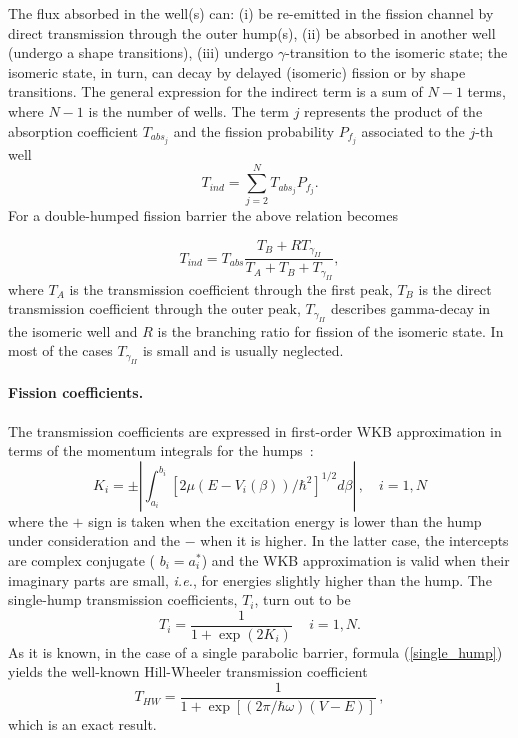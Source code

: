 \documentclass[twocolumn,amsmath,amssymb,10pt,groupedaddress,a4paper]{revtex4}
\begin{document}
The flux absorbed in the well(s) can:
\newline\qquad(i) be re-emitted in the fission channel by direct transmission
                  through the outer hump(s),
\newline\qquad(ii) be absorbed in another well (undergo a shape transitions),
\newline\qquad(iii) undergo $\gamma$-transition to the isomeric state; the
                   isomeric state, in turn, can decay by delayed (isomeric)
                   fission or by shape transitions.
The general expression for the indirect term is a sum of $N-1$ terms, where $N-1$ is the
number of wells. The term $j$ represents the product of the absorption coefficient $T_{abs_j}$
and the fission probability $P_{f_j}$ associated to the $j$-th well
%
\begin{equation}
T_{ind}=\sum_{j=2}^{N}T_{abs_j}P_{f_j}.
\label{tf}
\end{equation}
%
For a double-humped fission barrier the above relation becomes


\begin{equation}
T_{ind}=T_{abs}\frac{T_{B}+RT_{\gamma_{II}}}
{T_{A}+T_{B}+T_{\gamma_{II}}},
\end{equation}
%
where $T_{A}$ is the transmission coefficient through the first peak, $T_{B}$ is the direct
transmission coefficient through the outer peak, $T_{\gamma _{II}}$
describes gamma-decay in the isomeric well and $R$ is the branching ratio for
fission of the isomeric state. In most of the cases $T_{\gamma _{II}}$ is
small and is usually neglected.
\\
\paragraph*{Fission coefficients.}
The transmission coefficients are expressed in first-order WKB approximation
in terms of the momentum integrals for the humps~\cite{Froman:65, FD70}:
\begin{equation}
K_{i}=\pm\left\vert \int_{a_{i}}^{b_{i}}[2\mu(E-V_{i}(\beta))/\hbar^{2}%
]^{1/2}d\beta\right\vert \,,\quad i=1,N
\end{equation}
where the $+$ sign is taken when the excitation energy is lower than the hump
under consideration and the $-$ when it is higher. In the latter case, the
intercepts are complex conjugate ( $b_{i}=a_{i}^{\ast}$) and the WKB
approximation is valid when their imaginary parts are small, \textit{i.e.},
for energies slightly higher than the hump. The single-hump transmission
coefficients, $T_{i}$, turn out to be
\begin{equation}
T_{i}=\frac{1}{1+\exp(2K_{i})}\,\quad i=1,N.
\label{single_hump}%
\end{equation}
%
As it is known, in the case of a single parabolic barrier, formula (\ref{single_hump}) yields the well-known
Hill-Wheeler transmission coefficient~\cite{Bjornholm:80}
\begin{equation}
T_{HW}=\frac{1}{1+\exp\left[  (2\pi/{\hbar\omega}){(V-E)}\right]
}\,,\label{HW}%
\end{equation}
which is an exact result.
\end{document}

